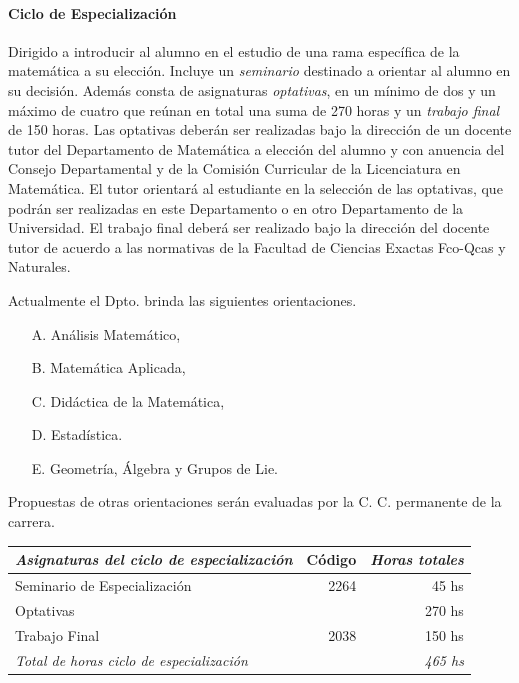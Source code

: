 \documentclass[a4paper, 12pt]{article}
\newenvironment{colortext}[1]{\color{#1}}{\ignorespacesafterend}
\begin{document}
\begin{colortext}{blue}
\paragraph{Ciclo de Especialización} Dirigido a introducir al alumno
en el estudio de una rama específica de la matemática a su
elección. Incluye un \emph{seminario}
 destinado a orientar al alumno en su decisión.  Además consta de asignaturas
\emph{optativas}, en un mínimo de dos y un máximo de cuatro que
reúnan en total una suma de 270 horas y un \emph{trabajo final} de
150 horas. Las optativas deberán ser realizadas bajo la dirección
de un docente tutor del Departamento de Matemática a elección del
alumno y con anuencia del Consejo Departamental y de la Comisión
Curricular de la Licenciatura en Matemática. El tutor orientará al
estudiante en la selección de las optativas, que podrán ser
realizadas en este Departamento o en otro Departamento de la
Universidad. El trabajo final deberá ser realizado bajo la
dirección del docente tutor de acuerdo a las normativas de la
Facultad de Ciencias Exactas Fco-Qcas y Naturales.


Actualmente el Dpto. brinda las siguientes orientaciones.




\begin{enumerate}
\item[A.] Análisis Matemático,
\item[B.]  Matemática Aplicada,
\item[C.] Didáctica de la Matemática,
\item[D.] Estadística.
\item[E.] Geometría, Álgebra y Grupos de Lie.
\end{enumerate}

Propuestas de otras orientaciones serán evaluadas por la C. C.
permanente de la carrera.

\begin{center}
\begin{tabular}{|l|r|r|}\hline
  \rowcolor[gray]{.9}
\emph{Asignaturas del ciclo de especialización  } & Código & \emph{Horas totales}      \\ \hline
Seminario de Especialización                      & 2264   &   45 hs                   \\ \hline
Optativas                                         &        &  270 hs                   \\ \hline
Trabajo Final                                     & 2038   &  150 hs                   \\ \hline
\emph{Total de horas ciclo de especialización}    & \multicolumn{2}{r|}{\emph{465 hs}} \\ \hline
\end{tabular}
\end{center}


\newpage

\end{colortext}
\end{document}
